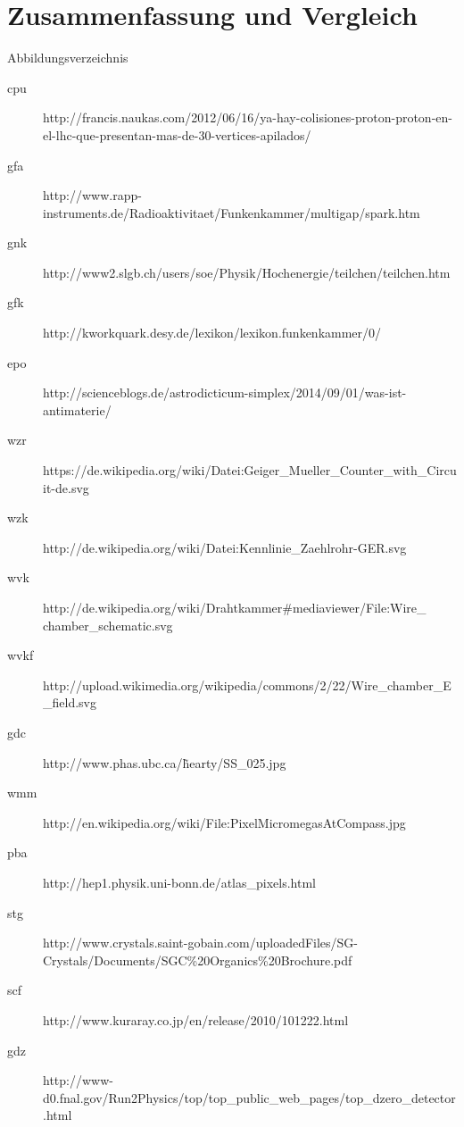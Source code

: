 \documentclass{beamer}
\begin{document}

\section{Zusammenfassung und Vergleich}



\begin{frame}{Abbildungsverzeichnis}
\footnotesize
	\begin{adjustwidth}{-5em}{-2em}
	  	\begin{description}
	  		\item[cpu]
		  	http://francis.naukas.com/2012/06/16/ya-hay-colisiones-proton-proton-en-el-lhc-que-presentan-mas-de-30-vertices-apilados/
			\item[gfa]
		  	http://www.rapp-instruments.de/Radioaktivitaet/Funkenkammer/multigap/spark.htm	
		  	\item[gnk]
		  	http://www2.slgb.ch/users/soe/Physik/Hochenergie/teilchen/teilchen.htm  
		  	\item[gfk]
		  	http://kworkquark.desy.de/lexikon/lexikon.funkenkammer/0/
		  	\item[epo]
		  	http://scienceblogs.de/astrodicticum-simplex/2014/09/01/was-ist-antimaterie/
		 	\item[wzr]
		  	https://de.wikipedia.org/wiki/Datei:Geiger\_Mueller\_Counter\_with\_Circuit-de.svg
		  	\item[wzk]
			http://de.wikipedia.org/wiki/Datei:Kennlinie\_Zaehlrohr-GER.svg
			\item[wvk]
		  	http://de.wikipedia.org/wiki/Drahtkammer\#mediaviewer/File:Wire\_ chamber\_schematic.svg
		  	\item[wvkf]
		  	http://upload.wikimedia.org/wikipedia/commons/2/22/Wire\_chamber\_E\_field.svg
		  	\item[gdc]
		  	http://www.phas.ubc.ca/\~hearty/SS\_025.jpg
		  	\item[wmm]
		  	http://en.wikipedia.org/wiki/File:PixelMicromegasAtCompass.jpg
		  	\item[pba]
		  	http://hep1.physik.uni-bonn.de/atlas\_pixels.html
		  	\item[stg]
		  	http://www.crystals.saint-gobain.com/uploadedFiles/SG-Crystals/Documents/SGC\%20Organics\%20Brochure.pdf
		  	\item[scf]
		  	http://www.kuraray.co.jp/en/release/2010/101222.html
			\item[gdz]
		  	http://www-d0.fnal.gov/Run2Physics/top/top\_public\_web\_pages/top\_dzero\_detector.html
		  	
		\end{description}
	\end{adjustwidth}
\end{frame}
\end{document}
